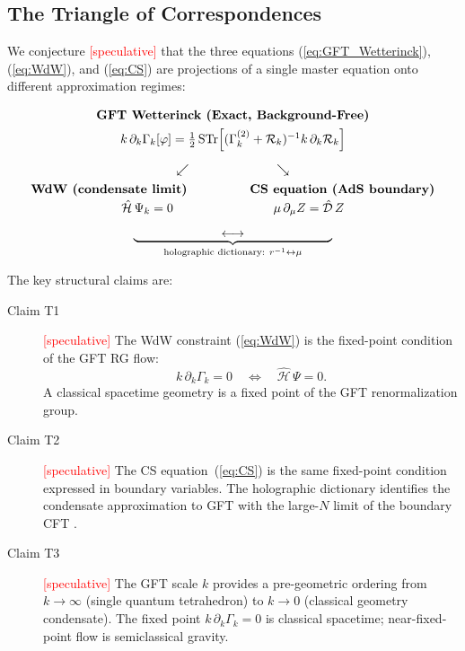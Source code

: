 \documentclass[11pt,a4paper]{article}
\begin{document}
\subsection{The Triangle of Correspondences}
\label{sec:triangle}

We conjecture \textcolor{red}{[speculative]} that the three equations
(\ref{eq:GFT_Wetterinck}), (\ref{eq:WdW}), and (\ref{eq:CS}) are projections of a single
master equation onto different approximation regimes:

\begin{equation}
\begin{array}{c}
\textbf{GFT Wetterinck (Exact, Background-Free)}\\[4pt]
k\,\partial_{k}\Gamma_{k}[\varphi]
= \tfrac{1}{2}\,\mathrm{STr}\!\left[
  (\Gamma_{k}^{(2)}+\mathcal{R}_{k})^{-1}k\,\partial_{k}\mathcal{R}_{k}
\right]\\[12pt]
\swarrow\hspace{70pt}\searrow\\[4pt]
\textbf{WdW (condensate limit)}
\hspace{50pt}
\textbf{CS equation (AdS boundary)}\\[2pt]
\hat{\mathcal{H}}\,\Psi_{k}=0
\hspace{80pt}
\mu\,\partial_{\mu}Z = \hat{\mathcal{D}}\,Z\\[8pt]
\underbrace{\hspace{70pt}\longleftrightarrow\hspace{70pt}}_{%
  \text{holographic dictionary: }r^{-1}\leftrightarrow\mu}
\end{array}
\label{eq:triangle}
\end{equation}

The key structural claims are:
\begin{description}
  \item[Claim T1] \textcolor{red}{[speculative]}
    The WdW constraint (\ref{eq:WdW}) is the fixed-point condition of the GFT RG flow:
    \begin{equation}
      k\,\partial_{k}\Gamma_{k} = 0
      \quad\Longleftrightarrow\quad
      \hat{\mathcal{H}}\,\Psi = 0.
      \label{eq:T1}
    \end{equation}
    A classical spacetime geometry is a fixed point of the GFT renormalization group.

  \item[Claim T2] \textcolor{red}{[speculative]}
    The CS equation~(\ref{eq:CS}) is the same fixed-point condition expressed in boundary
    variables.  The holographic dictionary identifies the condensate approximation to GFT
    with the large-$N$ limit of the boundary CFT \cite{maldacena1997,witten1998}.

  \item[Claim T3] \textcolor{red}{[speculative]}
    The GFT scale $k$ provides a pre-geometric ordering from $k\to\infty$ (single quantum
    tetrahedron) to $k\to 0$ (classical geometry condensate).  The fixed point
    $k\,\partial_{k}\Gamma_{k}=0$ is classical spacetime; near-fixed-point flow is
    semiclassical gravity.
\end{description}
\end{document}
